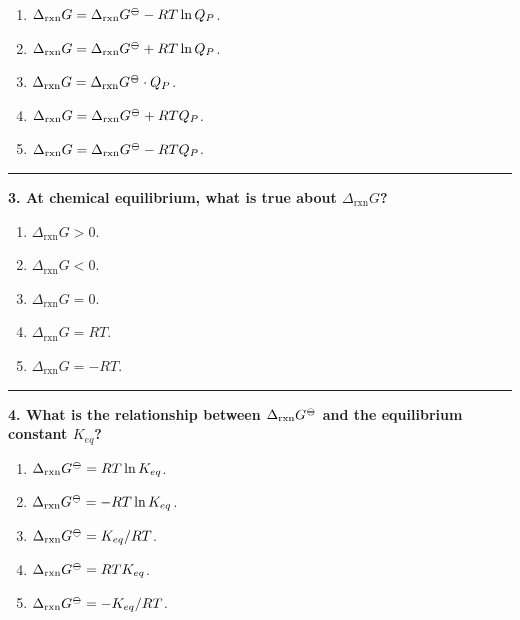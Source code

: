 \documentclass[
  9pt,
]{extbook}
\providecommand{\tightlist}{%
  \setlength{\itemsep}{0pt}\setlength{\parskip}{0pt}}
\theoremstyle{definition}
\theoremstyle{definition}
\theoremstyle{definition}
\theoremstyle{remark}
\begin{document}
\begin{enumerate}
\def\labelenumi{\alph{enumi}.}
\tightlist
\item
  \(\Delta_{\text{rxn}}G = \Delta_{\text{rxn}}G^{{-\kern-6pt{\ominus}\kern-6pt-}} - RT\ln Q_P\).
\item
  \(\Delta_{\text{rxn}}G = \Delta_{\text{rxn}}G^{{-\kern-6pt{\ominus}\kern-6pt-}} + RT\ln Q_P\).
\item
  \(\Delta_{\text{rxn}}G = \Delta_{\text{rxn}}G^{{-\kern-6pt{\ominus}\kern-6pt-}} \cdot Q_P\).
\item
  \(\Delta_{\text{rxn}}G = \Delta_{\text{rxn}}G^{{-\kern-6pt{\ominus}\kern-6pt-}} + RTQ_P\).
\item
  \(\Delta_{\text{rxn}}G = \Delta_{\text{rxn}}G^{{-\kern-6pt{\ominus}\kern-6pt-}} - RTQ_P\).
\end{enumerate}

\begin{center}\rule{0.5\linewidth}{0.5pt}\end{center}

\textbf{3. At chemical equilibrium, what is true about \(\Delta_{\text{rxn}}G\)?}

\begin{enumerate}
\def\labelenumi{\alph{enumi}.}
\tightlist
\item
  \(\Delta_{\text{rxn}}G > 0\).
\item
  \(\Delta_{\text{rxn}}G < 0\).
\item
  \(\Delta_{\text{rxn}}G = 0\).
\item
  \(\Delta_{\text{rxn}}G = RT\).
\item
  \(\Delta_{\text{rxn}}G = -RT\).
\end{enumerate}

\begin{center}\rule{0.5\linewidth}{0.5pt}\end{center}

\textbf{4. What is the relationship between \(\Delta_{\text{rxn}}G^{{-\kern-6pt{\ominus}\kern-6pt-}}\) and the equilibrium constant \(K_{eq}\)?}

\begin{enumerate}
\def\labelenumi{\alph{enumi}.}
\tightlist
\item
  \(\Delta_{\text{rxn}}G^{{-\kern-6pt{\ominus}\kern-6pt-}} = RT\ln K_{eq}\).
\item
  \(\Delta_{\text{rxn}}G^{{-\kern-6pt{\ominus}\kern-6pt-}} = -RT\ln K_{eq}\).
\item
  \(\Delta_{\text{rxn}}G^{{-\kern-6pt{\ominus}\kern-6pt-}} = K_{eq}/RT\).
\item
  \(\Delta_{\text{rxn}}G^{{-\kern-6pt{\ominus}\kern-6pt-}} = RTK_{eq}\).
\item
  \(\Delta_{\text{rxn}}G^{{-\kern-6pt{\ominus}\kern-6pt-}} = -K_{eq}/RT\).
\end{enumerate}
\end{document}
